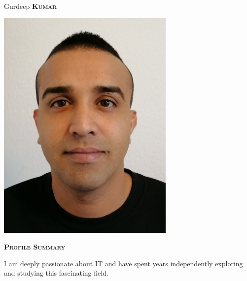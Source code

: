 \documentclass[11pt, a4paper]{article}
\newcommand{\headleft}[1]{\vspace*{3ex}\textsc{\textbf{#1}}\par%
    \vspace*{-1.5ex}\hrulefill\par\vspace*{0.7ex}}
\begin{document}
\setlength{\topskip}{0pt}
\setlength{\parindent}{0pt}
\setlength{\parskip}{0pt}
\setlength{\fboxsep}{0pt}
\pagestyle{empty}
\raggedbottom

\begin{minipage}[t]{0.33\textwidth} %
\colorbox{cvblue}{\begin{minipage}[t][5mm][t]{\textwidth}\null\hfill\null\end{minipage}}

\vspace{-.2ex} %
\colorbox{cvblue!90}{\color{white}  %
\textwidth\relax%
\begin{minipage}[t][293mm][t]{0.82\textwidth}
\raggedright
\vspace*{2.5ex}

\Large Gurdeep \textbf{\textsc{Kumar}} \normalsize 

\null\hfill\includegraphics[width=0.65\textwidth]{foto.jpg}\hfill\null

\vspace*{0.5ex} %

\headleft{Profile Summary}
I am deeply passionate about IT and have spent years independently exploring and studying this fascinating field.


\end{minipage}}
\end{minipage}
\end{document}
